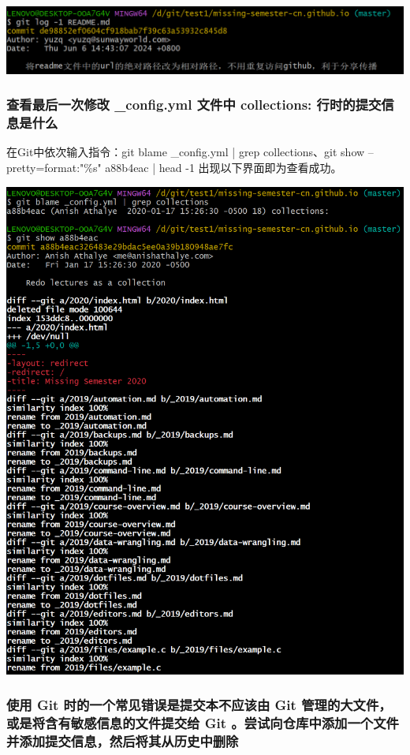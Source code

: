 \documentclass[UTF8,a4paper]{ctexart}
\begin{document}
\begin{sloppypar}
	\includegraphics[width = 16cm]{5}
	
	\subsubsection{查看最后一次修改 \_config.yml 文件中 collections: 行时的提交信息是什么}
	在Git中依次输入指令：git blame \_config.yml | grep collections、git show --pretty=format:"\%s" a88b4eac | head -1 出现以下界面即为查看成功。
	
	\includegraphics[width = 16cm]{6}
	
	\subsubsection{使用 Git 时的一个常见错误是提交本不应该由 Git 管理的大文件，或是将含有敏感信息的文件提交给 Git 。尝试向仓库中添加一个文件并添加提交信息，然后将其从历史中删除}
	

\end{sloppypar}
\end{document}

